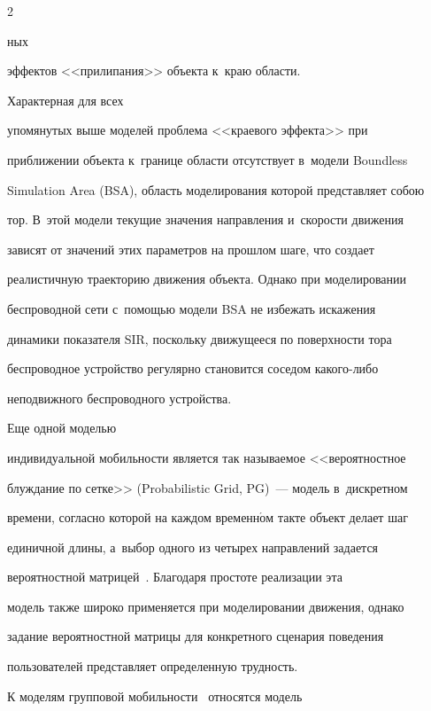\begin{multicols}{2} 



\noindent

ных

эффектов <<прилипания>> объекта к~краю об\-ласти. 



Характерная для всех 

упомянутых выше моделей проб\-ле\-ма <<краевого эффекта>> при 

приближении объекта к~границе об\-ласти отсутствует в~модели Boundless 

Simulation Area (BSA), об\-ласть моделирования которой пред\-став\-ля\-ет собою 

тор. В~этой модели текущие значения на\-прав\-ле\-ния и~ско\-рости движения 

зависят от значений этих па\-ра\-мет\-ров на прошлом шаге, что создает 

реалистичную траекторию движения объекта. Однако при моделировании 

беспроводной сети с~по\-мощью модели BSA не избежать искажения 

динамики показателя SIR, поскольку движущееся по по\-верх\-ности тора 

беспроводное устройство регулярно становится соседом ка\-ко\-го-ли\-бо 

неподвижного беспроводного устройства. 



Еще одной моделью 

индивидуальной мо\-биль\-ности является так на\-зы\-ва\-емое <<вероятностное 

блуж\-да\-ние по сетке>> (Probabilistic Grid, PG)~--- модель в~дискретном 

времени, со\-глас\-но которой на каждом временн$\acute{\mbox{о}}$м такте объект делает шаг 

единичной длины, а~выбор одного из четырех на\-прав\-ле\-ний задается 

вероятностной мат\-ри\-цей~\cite{10-sg}. Благодаря простоте реализации эта 

модель так\-же широко применяется при моделировании движения, однако 

задание вероятностной мат\-ри\-цы для конкретного сценария поведения 

пользователей пред\-став\-ля\-ет определенную труд\-ность.

  

  К моделям групповой мо\-биль\-ности~\cite{10-sg, 11-sg} относятся модель 


\end{multicols}
